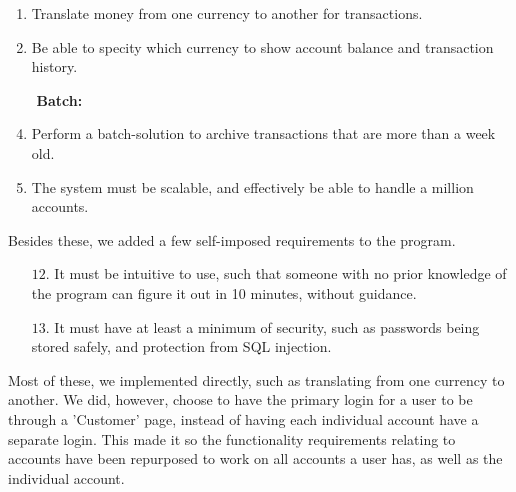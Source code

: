 \begin{mdframed}[backgroundcolor=black!5]
\begin{enumerate}
\item Translate money from one currency to another for transactions.

\item Be able to specity which currency to show account balance and transaction history.

\item[$ $] \textbf{Batch:}

\item Perform a batch-solution to archive transactions that are more than a week old.

\item The system must be scalable, and effectively be able to handle a million accounts.
\end{enumerate}

\end{mdframed}

Besides these, we added a few self-imposed requirements to the program.

\begin{enumerate}
    \item[$12.$] It must be intuitive to use, such that someone with no prior knowledge of the program can figure it out in 10 minutes, without guidance.
    \item[$13.$] It must have at least a minimum of security, such as passwords being stored safely, and protection from SQL injection.
\end{enumerate}

Most of these, we implemented directly, such as translating from one currency to another. We did, however, choose to have the primary login for a user to be through a 'Customer' page, instead of having each individual account have a separate login. This made it so the functionality requirements relating to accounts have been repurposed to work on all accounts a user has, as well as the individual account. 

